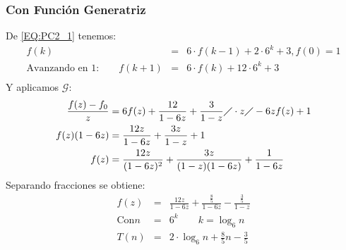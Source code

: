 	\subsubsection{Con Función Generatriz}
		De \ref{EQ:PC2_1} tenemos:
		\begin{eqnarray*}
			f(k) &=& 6 \cdot f(k-1) + 2 \cdot 6^{k} + 3, f(0) = 1\\
			\text{Avanzando en 1:} \qquad f(k+1) &=& 6 \cdot f(k) + 12 \cdot 6^{k} + 3\\
		\end{eqnarray*}
		Y aplicamos $\mathcal{G}$:
		\begin{eqnarray*}
			\frac{f(z) - f_0}{z} &= 6f(z) + \frac{12}{1-6z} + \frac{3}{1-z} \diagup \cdot z \diagup -6zf(z) +1 \\
			f(z)(1-6z) &= \frac{12z}{1-6z} + \frac{3z}{1-z} + 1 \\
			f(z) &= \frac{12z}{(1-6z)^2} + \frac{3z}{(1-z)(1-6z)} + \frac{1}{1-6z}
		\end{eqnarray*}
		Separando fracciones se obtiene:
		\begin{eqnarray*}
			f(z) &=& \frac{12z}{1-6z} + \frac{\frac{8}{5}}{1-6z} -  \frac{\frac{3}{5}}{1-z}\\
			\text{Con} n &=& 6^{k} \qquad k = \log_6 n\\
			T(n) &=& 2 \cdot \log_6 n  + \frac{8}{5} n - \frac{3}{5}
		\end{eqnarray*}